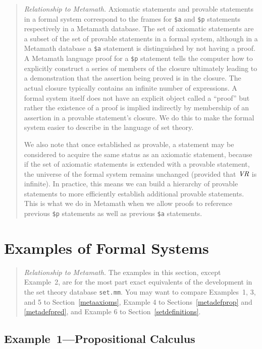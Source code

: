 {\footnotesize\begin{quotation}
{\em Relationship to Metamath.} Axiomatic statements
 and provable statements in a formal
system correspond to the frames for \texttt{\$a} and \texttt{\$p} statements
respectively in a Metamath database.  The set of axiomatic statements are a
subset of the set of provable statements in a formal system, although in a
Metamath database a \texttt{\$a} statement is distinguished by not having a
proof.  A Metamath language proof for a \texttt{\$p} statement tells the computer
how to explicitly construct a series of members of the closure ultimately
leading to a demonstration that the assertion
being proved is in the closure.  The actual closure typically contains
an infinite number of expressions.  A formal system itself does not have
an explicit object called a ``proof'' but rather the existence of a proof
is implied indirectly by membership of an assertion in a provable
statement's closure.  We do this to make the formal system easier
to describe in the language of set theory.

We also note that once established as provable, a statement may be considered
to acquire the same status as an axiomatic statement, because if the set of
axiomatic statements is extended with a provable statement, the universe of
the formal system remains unchanged (provided that $\mbox{\em VR}$ is
infinite).
In practice, this means we can build a hierarchy of provable statements to
more efficiently establish additional provable statements.  This is
what we do in Metamath when we allow proofs to reference previous
\texttt{\$p} statements as well as previous \texttt{\$a} statements.
\end{quotation}}

\section{Examples of Formal Systems}

{\footnotesize\begin{quotation}
{\em Relationship to Metamath.} The examples in this section, except Example~2,
are for the most part exact equivalents of the development in the set
theory database \texttt{set.mm}.  You may want to compare Examples~1, 3, and 5
to Section~\ref{metaaxioms}, Example 4 to Sections~\ref{metadefprop} and
\ref{metadefpred}, and Example 6 to
Section~\ref{setdefinitions}.\label{exampleref}
\end{quotation}}

\subsection{Example~1---Propositional Calculus}

